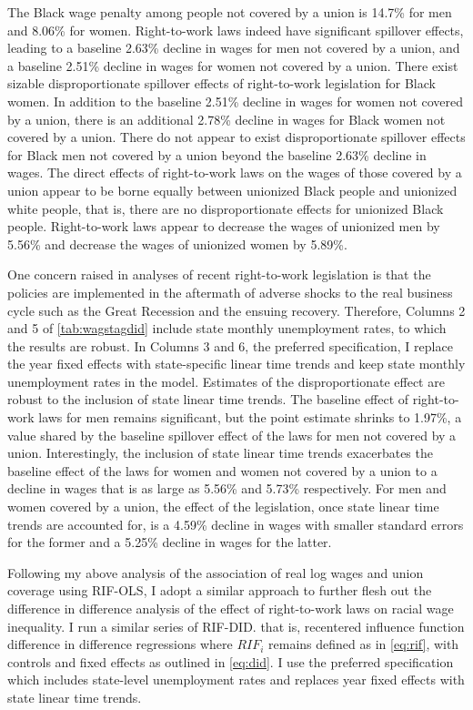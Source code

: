 \documentclass[11pt]{article}
\begin{document}
The Black wage penalty among people not covered by a union is 14.7\% for men and 8.06\% for women. Right-to-work laws indeed have significant spillover effects, leading to a baseline 2.63\% decline in wages for men not covered by a union, and a baseline 2.51\% decline in wages for women not covered by a union. There exist sizable disproportionate spillover effects of right-to-work legislation for Black women. In addition to the baseline 2.51\% decline in wages for women not covered by a union, there is an additional 2.78\% decline in wages for Black women not covered by a union. There do not appear to exist disproportionate spillover effects for Black men not covered by a union beyond the baseline 2.63\% decline in wages. The direct effects of right-to-work laws on the wages of those covered by a union appear to be borne equally between unionized Black people and unionized white people, that is, there are no disproportionate effects for unionized Black people. Right-to-work laws appear to decrease the wages of unionized men by 5.56\% and decrease the wages of unionized women by 5.89\%.

One concern raised in analyses of recent right-to-work legislation is that the policies are implemented in the aftermath of adverse shocks to the real business cycle such as the Great Recession and the ensuing recovery. Therefore, Columns 2 and 5 of \autoref{tab:wagstagdid} include state monthly unemployment rates, to which the results are robust. In Columns 3 and 6, the preferred specification, I replace the year fixed effects with state-specific linear time trends and keep state monthly unemployment rates in the model. Estimates of the disproportionate effect are robust to the inclusion of state linear time trends. The baseline effect of right-to-work laws for men remains significant, but the point estimate shrinks to 1.97\%, a value shared by the baseline spillover effect of the laws for men not covered by a union. Interestingly, the inclusion of state linear time trends exacerbates the baseline effect of the laws for women and women not covered by a union to a decline in wages that is as large as 5.56\% and 5.73\% respectively. For men and women covered by a union, the effect of the legislation, once state linear time trends are accounted for, is a 4.59\% decline in wages with smaller standard errors for the former and a 5.25\% decline in wages for the latter.

Following my above analysis of the association of real log wages and union coverage using RIF-OLS, I adopt a similar approach to further flesh out the difference in difference analysis of the effect of right-to-work laws on racial wage inequality. I run a similar series of RIF-DID. that is, recentered influence function difference in difference regressions where $RIF_i$ remains defined as in \autoref{eq:rif}, with controls and fixed effects as outlined in \autoref{eq:did}. I use the preferred specification which includes state-level unemployment rates and replaces year fixed effects with state linear time trends. 
\end{document}
